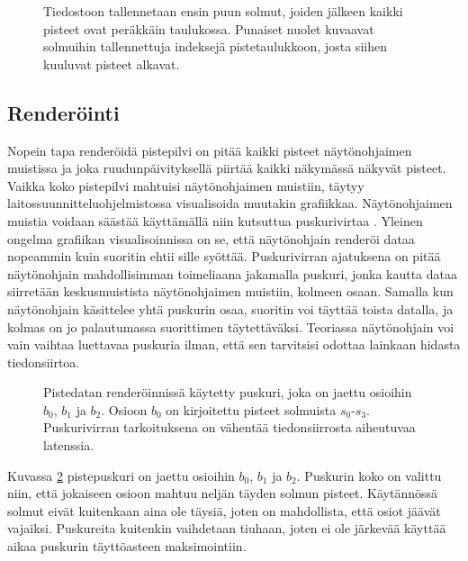 \begin{figure}
    \centering
    
    \caption{Tiedostoon tallennetaan ensin puun solmut, joiden jälkeen kaikki pisteet ovat peräkkäin taulukossa. Punaiset nuolet kuvaavat solmuihin tallennettuja indeksejä pistetaulukkoon, josta siihen kuuluvat pisteet alkavat.}
    \label{layout}
\end{figure}


\subsection{Renderöinti}\label{render}

Nopein tapa renderöidä pistepilvi on pitää kaikki pisteet näytönohjaimen muistissa ja joka ruudunpäivityksellä piirtää kaikki näkymässä näkyvät pisteet. Vaikka koko pistepilvi mahtuisi näytönohjaimen muistiin, täytyy laitossuunnitteluohjelmistossa visualisoida muutakin grafiikkaa. Näytönohjaimen muistia voidaan säästää käyttämällä niin kutsuttua puskurivirtaa . Yleinen ongelma grafiikan visualisoinnissa on se, että näytönohjain renderöi dataa nopeammin kuin suoritin ehtii sille syöttää. Puskurivirran ajatuksena on pitää näytönohjain mahdollisimman toimeliaana jakamalla puskuri, jonka kautta dataa siirretään keskusmuistista näytönohjaimen muistiin, kolmeen osaan. Samalla kun näytönohjain käsittelee yhtä puskurin osaa, suoritin voi täyttää toista datalla, ja kolmas on jo palautumassa suorittimen täytettäväksi. Teoriassa näytönohjain voi vain vaihtaa luettavaa puskuria ilman, että sen tarvitsisi odottaa lainkaan hidasta tiedonsiirtoa. \cite{opengl}

\begin{figure}
    \centering
    
    \caption{Pistedatan renderöinnissä käytetty puskuri, joka on jaettu osioihin $b_0$, $b_1$ ja $b_2$. Osioon $b_0$ on kirjoitettu pisteet solmuista $s_0$-$s_3$. Puskurivirran tarkoituksena on vähentää tiedonsiirrosta aiheutuvaa latenssia.}
    \label{triplebuffering}
\end{figure}

Kuvassa \ref{triplebuffering} pistepuskuri on jaettu osioihin $b_0$, $b_1$ ja $b_2$. Puskurin koko on valittu niin, että jokaiseen osioon mahtuu neljän täyden solmun pisteet. Käytännössä solmut eivät kuitenkaan aina ole täysiä, joten on mahdollista, että osiot jäävät vajaiksi. Puskureita kuitenkin vaihdetaan tiuhaan, joten ei ole järkevää käyttää aikaa puskurin täyttöasteen maksimointiin.

